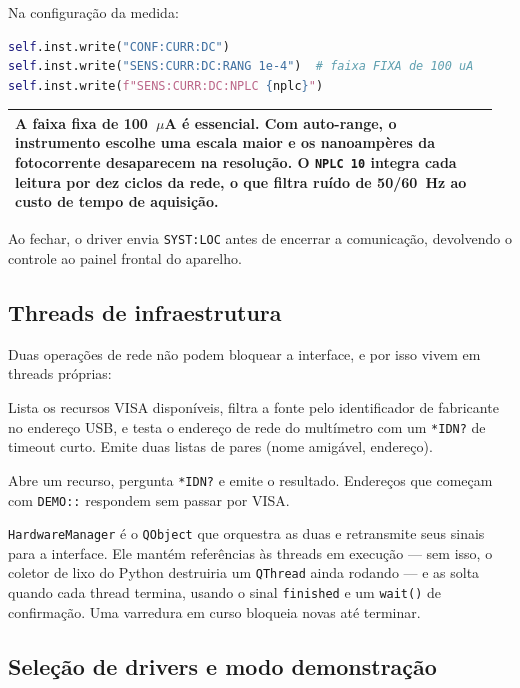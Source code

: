 \documentclass[11pt,a4paper]{article}
\newcommand{\classe}[1]{\texttt{#1}}
\newenvironment{nota}
  {\par\medskip\noindent\begin{tabular}{|p{0.96\linewidth}|}\hline\rule{0pt}{3ex}}
  {\\[1ex]\hline\end{tabular}\par\medskip}
\begin{document}
Na configuração da medida:

\begin{lstlisting}[language=Python]
self.inst.write("CONF:CURR:DC")
self.inst.write("SENS:CURR:DC:RANG 1e-4")  # faixa FIXA de 100 uA
self.inst.write(f"SENS:CURR:DC:NPLC {nplc}")
\end{lstlisting}

\begin{nota}
A faixa fixa de 100~$\mu$A é essencial. Com auto-range, o instrumento escolhe
uma escala maior e os nanoampères da fotocorrente desaparecem na resolução.
O \texttt{NPLC 10} integra cada leitura por dez ciclos da rede, o que
filtra ruído de 50/60~Hz ao custo de tempo de aquisição.
\end{nota}

Ao fechar, o driver envia \texttt{SYST:LOC} antes de encerrar a comunicação,
devolvendo o controle ao painel frontal do aparelho.

\subsection{Threads de infraestrutura}

Duas operações de rede não podem bloquear a interface, e por isso vivem em
threads próprias:

\begin{description}[style=nextline,leftmargin=0.6cm]
  \item[\classe{ScannerThread}]
    Lista os recursos VISA disponíveis, filtra a fonte pelo identificador de
    fabricante no endereço USB, e testa o endereço de rede do multímetro com um
    \texttt{*IDN?} de timeout curto. Emite duas listas de pares
    (nome amigável, endereço).

  \item[\classe{ValidatorThread}]
    Abre um recurso, pergunta \texttt{*IDN?} e emite o resultado. Endereços que
    começam com \texttt{DEMO::} respondem sem passar por VISA.
\end{description}

\classe{HardwareManager} é o \classe{QObject} que orquestra as duas e
retransmite seus sinais para a interface. Ele mantém referências às threads em
execução --- sem isso, o coletor de lixo do Python destruiria um
\classe{QThread} ainda rodando --- e as solta quando cada thread termina,
usando o sinal \texttt{finished} e um \texttt{wait()} de confirmação. Uma
varredura em curso bloqueia novas até terminar.

\subsection{Seleção de drivers e modo demonstração}
\end{document}
